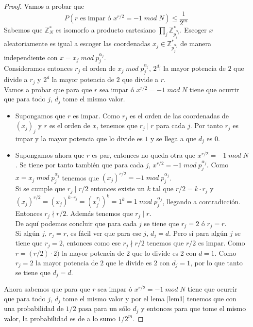 \documentclass[a4paper]{article}
\numberwithin{equation}{section}
\newcommand{\modd}{\; mod \;}
\begin{document}
\begin{proof}
Vamos a probar que 
\begin{equation}
P(r \text{ es impar ó } x^{r/2} = -1 \modd N) \leq  \frac{1}{2^m}
\end{equation}
Sabemos que $\mathbb{Z}_{N}^{*}$ es isomorfo a producto cartesiano $\prod_{j} \mathbb{Z}_{p_{j}^{\alpha_j}}^{*}$. Escoger $x$ aleatoriamente es igual a escoger las coordenadas $x_j \in \mathbb{Z}_{p_{j}^{\alpha_j}}^{*}$ de manera independiente con $x = x_j \modd p_{j}^{\alpha_j}$.\\
Consideramos entonces $r_j$ el orden de $x_j \modd p_{j}^{\alpha_j}$, $2^{d_j}$ la mayor potencia de $2$ que divide a $r_j$ y $2^d$ la mayor potencia de $2$ que divide a $r$.\\
Vamos a probar que para que $r$ sea impar ó $x^{r/2} = -1 \modd N$ tiene que ocurrir que para todo $j$, $d_j$ tome el mismo valor.
\begin{itemize}
\item Supongamos que $r$ es impar. Como $r_j$ es el orden de las coordenadas de $(x_j)_j$ y $r$ es el orden de $x$, tenemos que $r_j\mid r$ para cada $j$. Por tanto $r_j$ es impar y la mayor potencia que lo divide es $1$ y se llega a que $d_j$ es $0$.

\item Supongamos ahora que $r$ es par, entonces no queda otra que $x^{r/2} = -1 \modd N$. Se tiene por tanto también que para cada $j$, $x^{r/2} = -1 \modd p_{j}^{\alpha_j}$. Como $x = x_j \modd p_{j}^{\alpha_j}$ tenemos que $(x_j)^{r/2} = -1 \modd p_{j}^{\alpha_j}$.\\
Si se cumple que $r_j \mid r/2$ entonces existe un $k$ tal que $r/2 = k\cdot r_j$ y $(x_j)^{r/2} = (x_j)^{k\cdot r_j} = (x_j^{r_j})^k = 1^k = 1 \modd p_{j}^{\alpha_j}$, llegando a contradicción. Entonces $r_j \nmid r/2$. Además tenemos que $r_j \mid r$.\\
De aquí podemos concluir que para cada $j$ se tiene que $r_j = 2$ ó $r_j = r$.\\
Si algún $j$, $r_j = r$, es fácil ver que para ese $j$, $d_j = d$. Pero si para algún $j$ se tiene que $r_j = 2$, entonces como ese $r_j \nmid r/2$ tenemos que $r/2$ es impar. Como $r = (r/2) \cdot 2)$ la mayor potencia de $2$ que lo divide es $2$ con $d = 1$. Como $r_j = 2$ la mayor potencia de $2$ que le divide es $2$ con $d_j = 1$, por lo que tanto se tiene que $d_j = d$.

\end{itemize}
Ahora sabemos que para que $r$ sea impar ó $x^{r/2} = -1 \modd N$ tiene que ocurrir que para todo $j$, $d_j$ tome el mismo valor y por el lema \ref{lem1} tenemos que con una probabilidad de $1/2$ pasa para un sólo $d_j$ y entonces para que tome el mismo valor, la probabilidad es de a lo sumo $1/2^m$.
\end{proof}
\end{document}
